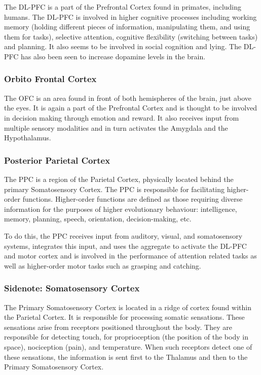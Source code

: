 \documentclass[a4paper, amsfonts, amssymb, amsmath, reprint, showkeys, nofootinbib, twoside]{revtex4-1}
\begin{document}
The DL-PFC is a part of the Prefrontal Cortex found in primates, including
humans. The DL-PFC is involved in higher cognitive processes including working memory
(holding different pieces of information, manipulating them, and using them for
tasks), selective attention, cognitive flexibility (switching between tasks) and
planning. It also seems to be involved in social cognition and lying. The DL-PFC has
also been seen to increase dopamine levels in the brain. \cite{dlpfcmemory,dlpfctasks,dlpfclying}

\subsubsection{Orbito Frontal Cortex}

The OFC is an area found in front of both hemispheres of the brain, just above the
eyes. It is again a part of the Prefrontal Cortex and is thought to be involved in
decision making through emotion and reward. It also receives input from multiple
sensory modalities and in turn activates the Amygdala and the
Hypothalamus. \cite{theprefrontalcortex,ofcprimates,theorbitofrontalcortex}

\subsubsection{Posterior Parietal Cortex}
The PPC is a region of the Parietal Cortex, physically located behind the primary
Somatosensory Cortex. The PPC is responsible for facilitating higher-order
functions. Higher-order functions are defined as those requiring diverse information
for the purposes of higher evolutionary behaviour: intelligence, memory, planning,
speech, orientation, decision-making, etc.

To do this, the PPC receives input from auditory, visual, and somatosensory
systems, integrates this input, and uses the aggregate to activate the DL-PFC and motor cortex and is
involved in the performance of attention related tasks as well as higher-order motor
tasks such as grasping and catching. \cite{parietallobesa,parietallobes}

\subsubsection{Sidenote: Somatosensory Cortex}
The Primary Somatosensory Cortex is located in a ridge of cortex found within the Parietal Cortex.
It is responsible for processing somatic sensations. These sensations arise from receptors
positioned throughout the body. They are responsible for detecting touch, for proprioception
(the position of the body in space), nociception (pain), and temperature. \cite{somato}
When such receptors detect one of these sensations, the information is sent first to
the Thalamus and then to the Primary Somatosensory Cortex.
\end{document}
